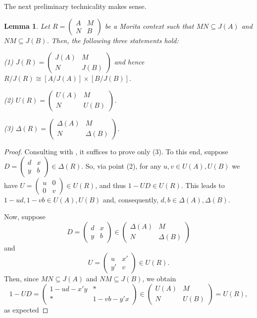 \documentclass[12pt]{amsart}
\newtheorem{lemma}[theorem]{Lemma}
\theoremstyle{definition}
\begin{document}
\medskip

The next preliminary technicality makes sense.

\begin{lemma}\label{rad morita}
Let $R = \begin{pmatrix}
A & M \\
N & B
\end{pmatrix}$ be a Morita context such that $MN \subseteq J(A)$ and $NM \subseteq J(B)$. Then, the following three statements hold:

(1) \quad  $J(R) = \begin{pmatrix}
    J(A) & M \\
    N & J(B)
    \end{pmatrix}$ and hence $R/J(R) \cong [A/J(A)] \times [B/J(B)]$.

(2)    $U(R) =\begin{pmatrix}
    U(A) & M \\
    N & U(B)
    \end{pmatrix}$.

(3)    $\Delta(R) =  \begin{pmatrix}
    \Delta(A) & M \\
    N & \Delta(B)
    \end{pmatrix}$.
\end{lemma}

\begin{proof}
Consulting with \cite[Lemma 3.1]{tang}, it suffices to prove only (3). To this end, suppose $D=\begin{pmatrix}
d & x \\
y & b
\end{pmatrix} \in \Delta(R)$. So, via point (2), for any $u,v \in U(A),U(B)$ we have $U=\begin{pmatrix}
u & 0 \\
0 & v
\end{pmatrix} \in U(R)$, and thus $1-UD \in U(R)$. This leads to $1-ud, 1-vb \in U(A), U(B)$ and, consequently, $d,b \in \Delta(A),\Delta(B)$.

Now, suppose $$D=\begin{pmatrix}
d & x \\
y & b
\end{pmatrix} \in \begin{pmatrix}
\Delta(A) & M \\
N & \Delta(B)
\end{pmatrix}$$ and $$U=\begin{pmatrix}
u & x' \\
y' & v
\end{pmatrix} \in U(R).$$ Then, since $MN \subseteq J(A)$ and $NM \subseteq J(B)$, we obtain
\[
1- UD=\begin{pmatrix}
1-ud-x'y & * \\
* & 1-vb-y'x
\end{pmatrix} \in \begin{pmatrix}
U(A) & M \\
N & U(B)
\end{pmatrix} = U(R),
\]
as expected
\end{proof}
\end{document}
